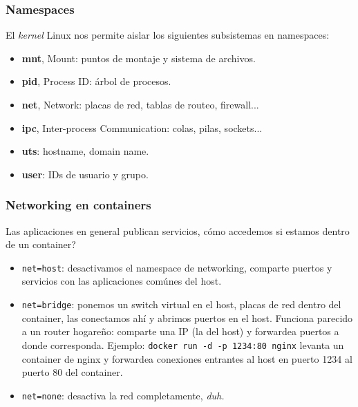 \documentclass[xcolor={dvipsnames}]{beamer}
\begin{document}
\begin{frame}[fragile]
	\frametitle{Namespaces}
	El \textit{kernel} Linux nos permite aislar los siguientes subsistemas en namespaces:
	\begin{itemize}
		\item \textbf{mnt}, Mount: puntos de montaje y sistema de archivos.
		\item \textbf{pid}, Process ID: árbol de procesos.
		\item \textbf{net}, Network: placas de red, tablas de routeo, firewall...
		\item \textbf{ipc}, Inter-process Communication: colas, pilas, sockets...
		\item \textbf{uts}: hostname, domain name.
		\item \textbf{user}: IDs de usuario y grupo.
	\end{itemize}
\end{frame}

\begin{frame}[fragile]
	\frametitle{Networking en containers}
	Las aplicaciones en general publican servicios, cómo accedemos si estamos dentro de un container?
	\begin{itemize}
		\item \texttt{net=host}: desactivamos el namespace de networking, comparte puertos y servicios con las aplicaciones comúnes del host.
		\item \texttt{net=bridge}: ponemos un switch virtual en el host, placas de red dentro del container, las conectamos ahí y abrimos puertos en el host. Funciona parecido a un router hogareño: comparte una IP (la del host) y forwardea puertos a donde corresponda. Ejemplo: \texttt{docker run -d -p 1234:80 nginx} levanta un container de nginx y forwardea conexiones entrantes al host en puerto 1234 al puerto 80 del container.
		\item \texttt{net=none}: desactiva la red completamente, \textit{duh.}
	\end{itemize}
\end{frame}
\end{document}
